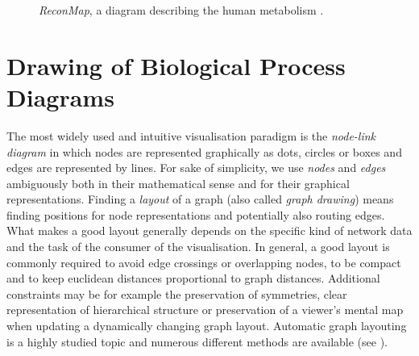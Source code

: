 \documentclass[
	fontsize=10pt, %
	twoside=false, %
	secnumdepth=1, %
  toc=indentunnumbered %
]{kaobook}
\begin{document}

\begin{figure}[h]
  \centering
  \caption[Screenshot of the \textit{ReconMap}]{\textit{ReconMap}, a
    diagram describing the human metabolism
    \cite{noronha_ReconMapInteractiveVisualization_2017}.}
  \label{fig:disease-map-example}
\end{figure}



\section{Drawing of Biological Process Diagrams}
\label{sec:draw-biol-netw}

The most widely used and intuitive visualisation paradigm is the
\textit{node-link diagram} in which nodes are represented graphically as dots,
circles or boxes and edges are represented by lines. For sake of simplicity, we
use \textit{nodes} and \textit{edges} ambiguously both in their mathematical
sense and for their graphical representations.
%
Finding a \textit{layout} of a graph (also called \textit{graph drawing}) means
finding positions for node representations and potentially also routing edges.
%
What makes a good layout generally depends on the specific kind of network data and the
task of the consumer of the visualisation.
%
In general, a good layout is commonly required to avoid edge crossings or
overlapping nodes, to be compact and to keep euclidean distances proportional to
graph distances.
Additional constraints may be for example the preservation of symmetries, clear
representation of hierarchical structure or preservation of a viewer's mental map when
updating a dynamically changing graph layout.
%
Automatic graph layouting is a highly studied topic and numerous different
methods are available (see ).
\end{document}
